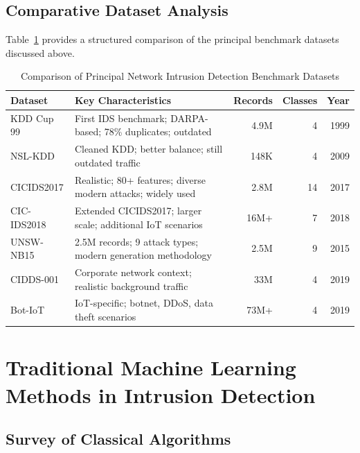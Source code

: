 \subsection{Comparative Dataset Analysis}

Table~\ref{tab:datasets} provides a structured comparison of the principal benchmark datasets discussed above.

\begin{table}[H]
\centering
\caption{Comparison of Principal Network Intrusion Detection Benchmark Datasets}
\label{tab:datasets}
\begin{tabular}{lp{5.5cm}rrr}
\toprule
\textbf{Dataset} & \textbf{Key Characteristics} & \textbf{Records} & \textbf{Classes} & \textbf{Year} \\
\midrule
KDD Cup 99    & First IDS benchmark; DARPA-based; 78\% duplicates; outdated & 4.9M  & 4 & 1999 \\
NSL-KDD       & Cleaned KDD; better balance; still outdated traffic         & 148K  & 4 & 2009 \\
CICIDS2017    & Realistic; 80+ features; diverse modern attacks; widely used & 2.8M & 14 & 2017 \\
CIC-IDS2018   & Extended CICIDS2017; larger scale; additional IoT scenarios & 16M+ & 7 & 2018 \\
UNSW-NB15     & 2.5M records; 9 attack types; modern generation methodology & 2.5M  & 9 & 2015 \\
CIDDS-001     & Corporate network context; realistic background traffic     & 33M   & 4 & 2019 \\
Bot-IoT       & IoT-specific; botnet, DDoS, data theft scenarios            & 73M+  & 4 & 2019 \\
\bottomrule
\end{tabular}
\end{table}

\section{Traditional Machine Learning Methods in Intrusion Detection}

\subsection{Survey of Classical Algorithms}

